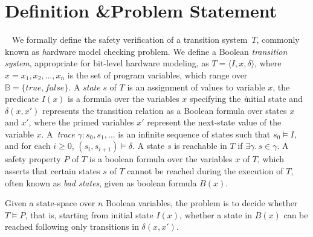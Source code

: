 \section{Definition \&Problem Statement}~\label{problem}
%
We formally define the safety verification of a transition system~$T$,
commonly known as {\emph hardware model checking problem}.  We define a
Boolean \textit{transition system}, appropriate for bit-level hardware
modeling, as $T = \langle I,x,\delta \rangle$, where $x = x_1,x_2,...,x_n$
is the set of program variables, which range over $\mathbb{B} =
\{\mathit{true}, \mathit{false}\}$.  A \emph{state} $s$ of $T$ is an
assignment of values to variable $x$, the predicate $I(x)$ is a formula over
the variables $x$ specifying the {\emph initial state} and $\delta(x,x')$
represents the transition relation as a Boolean formula over states $x$ and
$x'$, where the primed variables $x'$ represent the next-state value of the
variable $x$.  A~\emph{trace} $\gamma: s_0,s_1,...$ is an infinite sequence
of states such that $s_0 \models I$, and for each $i \geq 0$, $(s_i,s_{i+1})
\models \delta$.  A state $s$ is reachable in $T$ if $\exists \gamma.\, s
\in \gamma$.  A safety property $P$ of $T$ is a boolean formula over the
variables $x$ of $T$, which asserts that certain states $s$ of $T$ cannot be
reached during the execution of $T$, often known as \emph{bad states}, given
as boolean formula $B(x)$.

Given a state-space over $n$ Boolean variables, the problem is to
decide whether $T \models P$, that is, starting from initial state
$I(x)$, whether a state in $B(x)$ can be reached following only
transitions in $\delta(x,x')$.
%
